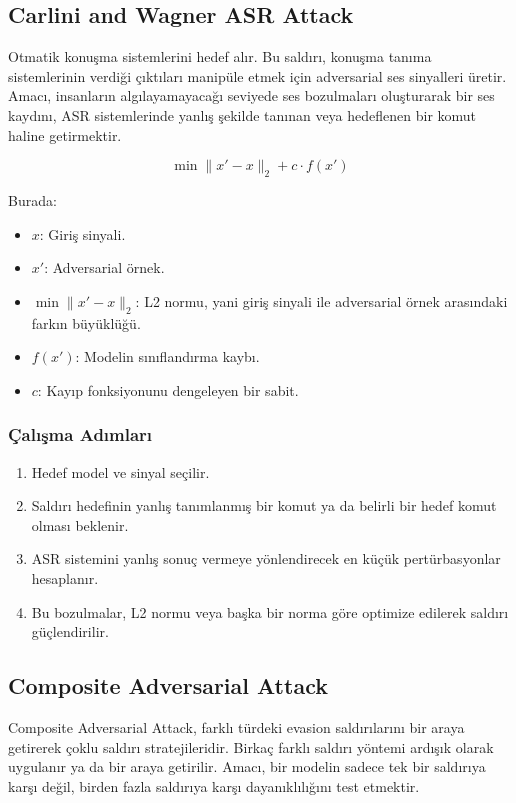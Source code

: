 \subsection{Carlini and Wagner ASR Attack}

Otmatik konuşma sistemlerini hedef alır. Bu saldırı, konuşma tanıma sistemlerinin verdiği çıktıları manipüle etmek için adversarial ses sinyalleri üretir. Amacı, insanların algılayamayacağı seviyede ses bozulmaları oluşturarak bir ses kaydını, ASR sistemlerinde yanlış şekilde tanınan veya hedeflenen bir komut haline getirmektir.

\[ \min \|x' - x\|_2 + c \cdot f(x') \]

Burada:

\begin{itemize}
    \item $x$: Giriş sinyali.
    \item $x'$: Adversarial örnek.
    \item $\min \|x' - x\|_2$: L2 normu, yani giriş sinyali ile adversarial örnek arasındaki farkın büyüklüğü.
    \item $f(x')$: Modelin sınıflandırma kaybı.
    \item $c$: Kayıp fonksiyonunu dengeleyen bir sabit.
\end{itemize}

\subsubsection{Çalışma Adımları}

\begin{enumerate}
    \item Hedef model ve sinyal seçilir.
    \item Saldırı hedefinin yanlış tanımlanmış bir komut ya da belirli bir hedef komut olması beklenir.
    \item ASR sistemini yanlış sonuç vermeye yönlendirecek en küçük pertürbasyonlar hesaplanır.
    \item Bu bozulmalar, L2 normu veya başka bir norma göre optimize edilerek saldırı güçlendirilir.
\end{enumerate}

\newpage

\subsection{Composite Adversarial Attack}

Composite Adversarial Attack, farklı türdeki evasion saldırılarını bir araya getirerek çoklu saldırı stratejileridir. Birkaç farklı saldırı yöntemi ardışık olarak uygulanır ya da bir araya getirilir. Amacı, bir modelin sadece tek bir saldırıya karşı değil, birden fazla saldırıya karşı dayanıklılığını test etmektir. 

